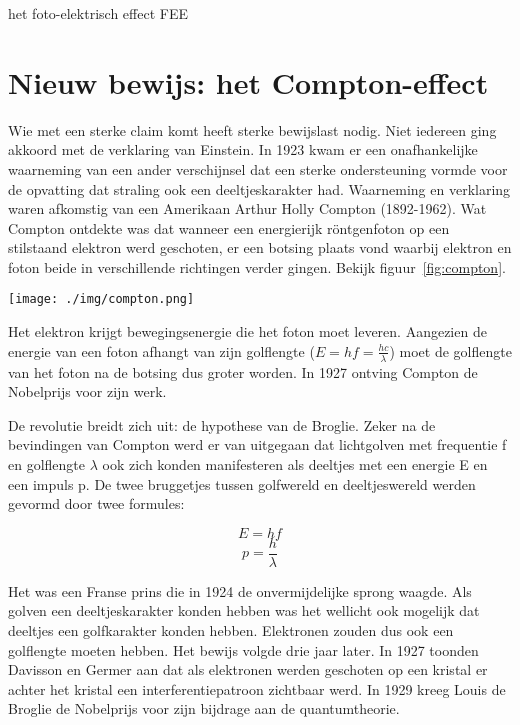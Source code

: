 {\begin{experiment}{het foto-elektrisch effect}
FEE
\end{experiment}



\section{Nieuw bewijs: het Compton-effect}
Wie met een sterke claim komt heeft sterke bewijslast nodig. Niet iedereen ging akkoord met de verklaring van Einstein. In 1923 kwam er een onafhankelijke waarneming van een ander verschijnsel dat een sterke ondersteuning vormde voor de opvatting dat straling ook een deeltjeskarakter had. Waarneming en verklaring waren afkomstig van een Amerikaan Arthur Holly Compton (1892-1962). Wat Compton ontdekte was dat wanneer een energierijk r\"ontgenfoton op een stilstaand elektron werd geschoten, er een botsing plaats vond waarbij elektron en foton beide in verschillende richtingen verder gingen. Bekijk figuur~\ref{fig:compton}.

\begin{center}
\leavevmode
\texttt{[image: ./img/compton.png]}
\end{center}

Het elektron krijgt bewegingsenergie die het foton moet leveren. Aangezien de energie van een foton afhangt van zijn golflengte ($E=hf=\tfrac{hc}{\lambda}$) moet de golflengte van het foton na de botsing dus groter worden. In 1927 ontving Compton de Nobelprijs voor zijn werk.

De revolutie breidt zich uit: de hypothese van de Broglie.
Zeker na de bevindingen van Compton werd er van uitgegaan dat lichtgolven met frequentie f en golflengte $\lambda$ ook zich konden manifesteren als deeltjes met een energie E en een impuls p. De twee bruggetjes tussen golfwereld en deeltjeswereld werden gevormd door twee formules:

$$E=hf$$
$$p=\frac{h}{\lambda}$$

Het was een Franse prins die in 1924 de onvermijdelijke sprong waagde. Als golven een deeltjeskarakter konden hebben was het wellicht ook mogelijk dat deeltjes een golfkarakter konden hebben. Elektronen zouden dus ook een golflengte moeten hebben.
Het bewijs volgde drie jaar later. In 1927 toonden Davisson en Germer aan dat als elektronen werden geschoten op een kristal er achter het kristal een interferentiepatroon zichtbaar werd. In 1929 kreeg Louis de Broglie de Nobelprijs voor zijn bijdrage aan de quantumtheorie.

}
